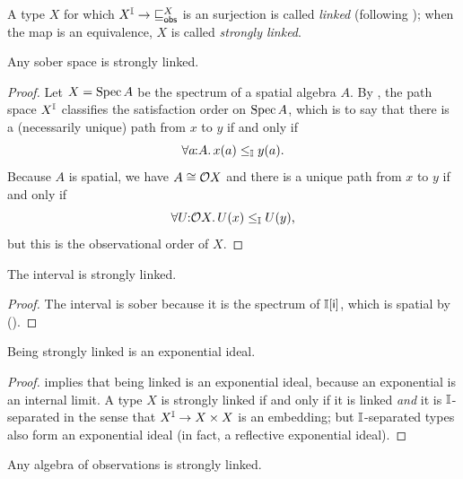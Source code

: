 \begin{definition}
  A type $X$ for which $X^\I\to {\obsle[X]}$ is an surjection is called \emph{linked} (following \citet{PhoaWesleyKym-Son1991DtiR}); when the map is an equivalence, $X$ is called \emph{strongly linked}.
\end{definition}

\begin{lemma}[\AxiomSQCP]\label{lem:sober-strongly-linked}
  Any sober space is strongly linked.
\end{lemma}

\begin{proof}
  Let $X=\operatorname{Spec}{A}$ be the spectrum of a spatial algebra $A$. 
  By , the path space $X^{\mathbb{I}}$ classifies the satisfaction order on $\operatorname{Spec}{A}$, which is to say that there is a (necessarily unique) path from $x$ to $y$ if and only if \[\fa{a}{A} x(a)\le_\I y(a)\text{.}\] Because $A$ is spatial, we have $A\cong \mathcal{O} X$ and there is a unique path from $x$ to $y$ if and only if \[\fa{U}{\opens{X}} U(x)\le_\I U(y)\text{,}\] but this is the observational order of $X$.
\end{proof}

\begin{lemma}[\AxiomSQCP]\label{lem:int-strong-link}
  The interval is strongly linked.
\end{lemma}

\begin{proof}
  The interval is sober because it is the spectrum of $\mathbb{I}[\mathsf{i}]$, which is spatial by (\AxiomSQCP).
\end{proof}

\begin{lemma}\label{lem:strong-link-exp-ideal}
  Being strongly linked is an exponential ideal.
\end{lemma}

\begin{proof}
  \citet[Prop.\ 5.4.4]{PhoaWesleyKym-Son1991DtiR} implies that being linked is an exponential ideal, because an exponential is an internal limit. A type $X$ is strongly linked if and only if it is linked \emph{and} it is $\mathbb{I}$-separated in the sense that $X^{\mathbb{I}}\to X\times X$ is an embedding; but $\mathbb{I}$-separated types also form an exponential ideal (in fact, a reflective exponential ideal).
\end{proof}

\begin{lemma}[\AxiomSQCP]\label{lem:O-strongly-linked}
  Any algebra of observations is strongly linked.
\end{lemma}


